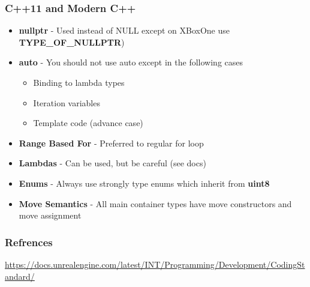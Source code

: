 \begin{frame}
  \frametitle{C++11 and Modern C++}
  \begin{itemize}
    \item \textbf{nullptr} - Used instead of NULL except on XBoxOne use \textbf{TYPE{\_}OF{\_}NULLPTR})
    \item \textbf{auto} - You should not use auto except in the following cases
    \begin{itemize}
      \item Binding to lambda types
      \item Iteration variables
      \item Template code (advance case)
    \end{itemize}
    \item \textbf{Range Based For} - Preferred to regular for loop
    \item \textbf{Lambdas} - Can be used, but be careful (see docs)
    \item \textbf{Enums} - Always use strongly type enums which inherit from \textbf{uint8}
    \item \textbf{Move Semantics} - All main container types have move constructors and move assignment
  \end{itemize}
\end{frame}

\begin{frame}
  \frametitle{Refrences}
  \url{https://docs.unrealengine.com/latest/INT/Programming/Development/CodingStandard/}
\end{frame}



